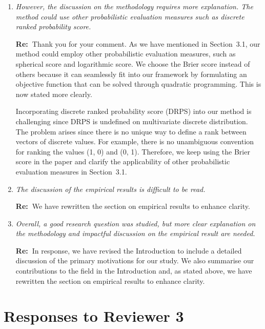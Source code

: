 \documentclass[11pt,a4paper]{article}
\newcommand{\RE}[2][Re:~]{{\color{blue}\textbf{#1}#2}}
\begin{document}
\begin{enumerate}
    \item \textit{However, the discussion on the methodology requires more explanation. The method could use other probabilistic evaluation measures such as discrete ranked probability score.}
   
    \RE{Thank you for your comment. As we have mentioned in Section~3.1, our method could employ other probabilistic evaluation measures, such as spherical score and logarithmic score. We choose the Brier score instead of others because it can seamlessly fit into our framework by formulating an objective function that can be solved through quadratic programming. This is now stated more clearly.
    
    Incorporating discrete ranked probability score (DRPS) into our method is challenging since DRPS is undefined on multivariate discrete distribution. The problem arises since there is no unique way to define a rank between vectors of discrete values. For example, there is no unambiguous convention for ranking the values (1, 0) and (0, 1). Therefore, we keep using the Brier score in the paper and clarify the applicability of other probabilistic evaluation measures in Section~3.1.
    }

    \item \textit{The discussion of the empirical results is difficult to be read.}
    
    \RE{We have rewritten the section on empirical results to enhance clarity.}
    
    \item \textit{Overall, a good research question was studied, but more clear explanation on the methodology and impactful discussion on the empirical result are needed.}
    
    \RE{In response, we have revised the Introduction to include a detailed discussion of the primary motivations for our study. We also summarise our contributions to the field in the Introduction and, as stated above, we have rewritten the section on empirical results to enhance clarity.}
    
\end{enumerate}




\newpage
\section*{Responses to Reviewer 3}\label{reviewer-3-comments}
\end{document}
